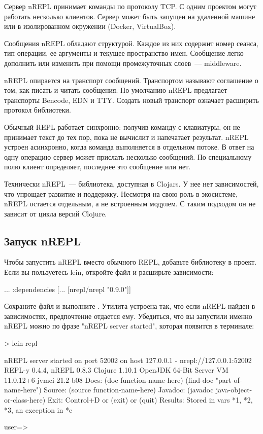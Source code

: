 Сервер nREPL принимает команды по протоколу TCP. С одним проектом могут работать несколько клиентов. Сервер может быть запущен на удаленной машине или в изолированном окружении (Docker, VirtualBox).

Сообщения nREPL обладают структурой. Каждое из них содержит номер сеанса, тип операции, ее аргументы и текущее пространство имен. Сообщение легко дополнить или изменить при помощи промежуточных слоев~--- middleware.

nREPL опирается на транспорт сообщений. Транспортом называют соглашение о том, как писать и читать сообщения. По умолчанию nREPL предлагает транспорты Bencode, EDN и TTY. Создать новый транспорт означает расширить протокол библиотеки.

Обычный REPL работает синхронно: получив команду с клавиатуры, он не принимает текст до тех пор, пока не вычислит и напечатает результат. nREPL устроен асинхронно, когда команда выполняется в отдельном потоке. В ответ на одну операцию сервер может прислать несколько сообщений. По специальному полю клиент определяет, последнее это сообщение или нет.

Технически nREPL~--- библиотека, доступная в Clojars. У нее нет зависимостей, что упрощает развитие и поддержку. Несмотря на свою роль в экосистеме, nREPL остается отдельным, а не встроенным модулем. С таким подходом он не зависит от цикла версий Clojure.

\subsection{Запуск nREPL}

Чтобы запустить nREPL вместо обычного REPL, добавьте библиотеку в проект. Если вы пользуетесь lein, откройте файл  и расширьте зависимости:

\begin{english}
  \begin{clojure}
{...
 :dependencies
 [... [nrepl/nrepl "0.9.0"]]}
  \end{clojure}
\end{english}

Сохраните файл и выполните . Утилита  устроена так, что если nREPL найден в зависимостях, предпочтение отдается ему. Убедиться, что вы запустили именно nREPL можно по фразе "nREPL server started", которая появится в терминале:

\begin{english}
  \begin{text}
> lein repl

nREPL server started on port 52002 on host 127.0.0.1 - nrepl://127.0.0.1:52002
REPL-y 0.4.4, nREPL 0.8.3
Clojure 1.10.1
OpenJDK 64-Bit Server VM 11.0.12+6-jvmci-21.2-b08
    Docs: (doc function-name-here)
          (find-doc "part-of-name-here")
  Source: (source function-name-here)
 Javadoc: (javadoc java-object-or-class-here)
    Exit: Control+D or (exit) or (quit)
 Results: Stored in vars *1, *2, *3, an exception in *e

user=>
  \end{text}
\end{english}

